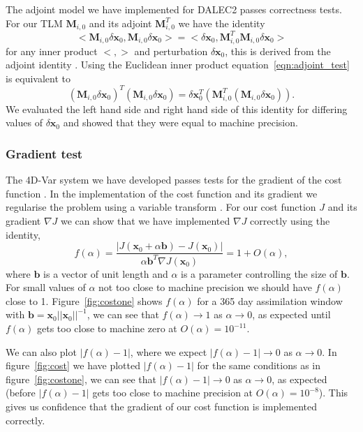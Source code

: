 \documentclass[11pt]{article}
\begin{document}
The adjoint model we have implemented for DALEC2 passes correctness tests. For our TLM $\mathbf{M}_{i,0}$ and its adjoint $\mathbf{M}_{i,0}^{T}$ we have the identity
\begin{equation}
<\mathbf{M}_{i,0}\delta\textbf{x}_0, \mathbf{M}_{i,0}\delta\textbf{x}_0> = <\delta\textbf{x}_0, \mathbf{M}_{i,0}^{T}\mathbf{M}_{i,0}\delta\textbf{x}_0> \label{eqn:adjoint_test}
\end{equation}
for any inner product $<, >$ and perturbation $\delta \textbf{x}_0$, this is derived from the adjoint identity \citep{lawless2013}. Using the Euclidean inner product equation~\ref{eqn:adjoint_test} is equivalent to
\begin{equation}
(\mathbf{M}_{i,0}\delta\textbf{x}_0)^{T} (\mathbf{M}_{i,0}\delta\textbf{x}_0) = \delta\textbf{x}_0^{T} (\mathbf{M}_{i,0}^{T}(\mathbf{M}_{i,0}\delta\textbf{x}_0)).
\end{equation}
We evaluated the left hand side and right hand side of this identity for differing values of $\delta \textbf{x}_0$ and showed that they were equal to machine precision.

\subsubsection{Gradient test} \label{sec:testgrad}

The 4D-Var system we have developed passes tests for the gradient of the cost function \citep{Navon1992}. In the implementation of the cost function and its gradient we regularise the problem using a variable transform \citep{Freitag2010}. For our cost function $J$ and its gradient $\nabla J$ we can show that we have implemented $\nabla J$ correctly using the identity,
\begin{equation}
f(\alpha)=\frac{| J( \textbf{x}_0 + \alpha \textbf{b}) - J(\textbf{x}_0) |}{\alpha \textbf{b}^{T} \nabla J(\textbf{x}_0)} = 1 + O(\alpha),
\end{equation}
where $\textbf{b}$ is a vector of unit length and $\alpha$ is a parameter controlling the size of $\textbf{b}$. For small values of $\alpha$ not too close to machine precision we should have $f(\alpha)$ close to 1. Figure~\ref{fig:costone} shows $f(\alpha)$ for a 365 day assimilation window with $\textbf{b}=\textbf{x}_0||\textbf{x}_0||^{-1}$, we can see that $f(\alpha) \rightarrow 1$ as $\alpha \rightarrow 0$, as expected until $f(\alpha)$ gets too close to machine zero at $O(\alpha) = 10^{-11}$.

We can also plot $|f(\alpha)-1|$, where we expect $|f(\alpha)-1| \rightarrow 0$ as $\alpha \rightarrow 0$.  In figure~\ref{fig:cost} we have plotted $|f(\alpha)-1|$ for the same conditions as in figure~\ref{fig:costone}, we can see that $|f(\alpha) - 1| \rightarrow 0$ as $\alpha \rightarrow 0$, as expected (before $|f(\alpha)-1|$ gets too close to machine precision at $O(\alpha) = 10^{-8}$). This gives us confidence that the gradient of our cost function is implemented correctly.
\end{document}
